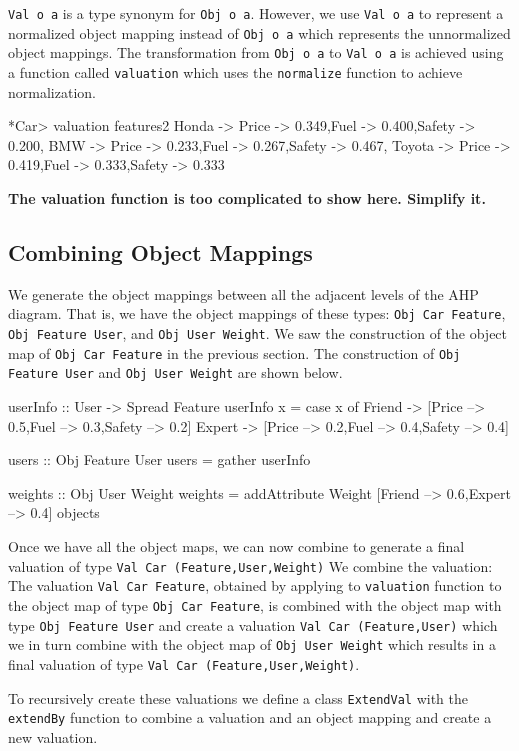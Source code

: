 \documentclass{jfp}
\newcommand{\NOTE}[2][gray]{\smallskip\noindent
  \colorbox{#1!30}{\parbox{.98\linewidth}{{\small\textbf{#2}}}}
}
\newcommand{\prog}[1]{\texttt{#1}}
\begin{document}
\prog{Val o a} is a type synonym for \prog{Obj o a}. However, we use \prog{Val o a} to represent a normalized object mapping instead of \prog{Obj o a} which represents the unnormalized object mappings. The transformation from \prog{Obj o a} to \prog{Val o a} is achieved using a function called \prog{valuation} which uses the \prog{normalize} function to achieve normalization.
\begin{haskellcode}
*Car> valuation features2
{Honda -> {Price -> 0.349,Fuel -> 0.400,Safety -> 0.200},
 BMW -> {Price -> 0.233,Fuel -> 0.267,Safety -> 0.467},
 Toyota -> {Price -> 0.419,Fuel -> 0.333,Safety -> 0.333}}
\end{haskellcode}

\NOTE{The valuation function is too complicated to show here. Simplify it. }

\subsection{Combining Object Mappings}
We generate the object mappings between all the adjacent levels of the AHP diagram. That is, we have the object mappings of these types: \prog{Obj Car Feature}, \prog{Obj Feature User}, and \prog{Obj User Weight}. We saw the construction of the object map of \prog{Obj Car Feature} in the previous section. The construction of \prog{Obj Feature User} and \prog{Obj User Weight} are shown below.
\begin{haskellcode}
userInfo :: User -> Spread Feature
userInfo x 
    = case x of 
        Friend -> [Price --> 0.5,Fuel --> 0.3,Safety --> 0.2]
        Expert -> [Price --> 0.2,Fuel --> 0.4,Safety --> 0.4]

users :: Obj Feature User
users = gather userInfo

weights :: Obj User Weight
weights = addAttribute Weight [Friend --> 0.6,Expert --> 0.4] objects
\end{haskellcode}
Once we have all the object maps, we can now combine to generate a final valuation of type \prog{Val Car (Feature,User,Weight)} We combine the valuation: The valuation \prog{Val Car Feature}, obtained by applying to \prog{valuation} function to the object map of type \prog{Obj Car Feature}, is combined with the object map with type \prog{Obj Feature User} and create a valuation \prog{Val Car (Feature,User)} which we in turn combine with the object map of \prog{Obj User Weight} which results in a final valuation of type \prog{Val Car (Feature,User,Weight)}. 

To recursively create these valuations we define a class \prog{ExtendVal} with the \prog{extendBy} function to combine a valuation and an object mapping and create a new valuation. 
\end{document}
